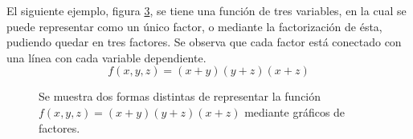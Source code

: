 \documentclass[11pt,twoside,spanish]{report} %
\begin{document}
El siguiente ejemplo, figura \ref{graph:FGej1}, se tiene una funci\'on de tres variables, en la cual se puede representar como un \'unico factor, o mediante la factorizaci\'on de \'esta, pudiendo quedar en tres factores. 
Se observa que cada factor est\'a conectado con una l\'inea con cada variable dependiente.
	\begin{equation*}
	f(x,y,z) = (x+y)(y+z)(x+z)
	\end{equation*}
\begin{center}

	\begin{figure}[H]
		\centering
		\begin{subfigure}{.5\textwidth}
			\centering
			\caption{}
			\label{graph:FGej1-1}
		\end{subfigure}%
		\begin{subfigure}{.5\textwidth}
			\centering
			\caption{}
			\label{graph:FGej1-2}
		\end{subfigure}
		\caption{Se muestra dos formas distintas de representar la funci\'on $f(x,y,z) = (x+y)(y+z)(x+z)$ mediante gr\'aficos de factores. }
		\label{graph:FGej1}
	\end{figure}
\end{center}
\end{document}
